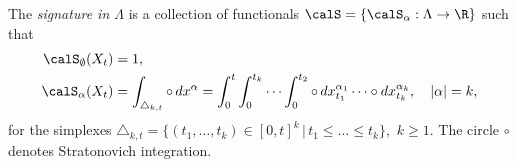  \begin{definition}\label{def:Sig}
     The \textit{signature in $\Lambda$} is a collection  of functionals $\calS = \{\calS_{\alpha}: \Lambda \to \R\}$ such that
     \begin{align*}
     \calS_{\emptyset}(X_t) &= 1, \\
         \calS_{\alpha}(X_t) &= \int_{\triangle_{k,t}} \circ \, dx^{\alpha} =\int_{0}^{t} \int_{0}^{t_k} \cdots \int_{0}^{t_2} \circ \, dx^{\alpha_1}_{t_1} \cdots \circ dx^{\alpha_k}_{t_k}, \quad |\alpha|=k,
     \end{align*}
     for  the simplexes $\triangle_{k,t}= \{(t_1,\ldots,t_k)\in [0,t]^k\,|\, t_1 \le \ldots \le t_k\}$, $\, k\ge 1$.  The circle $\circ$ denotes Stratonovich integration. 
 \end{definition}
